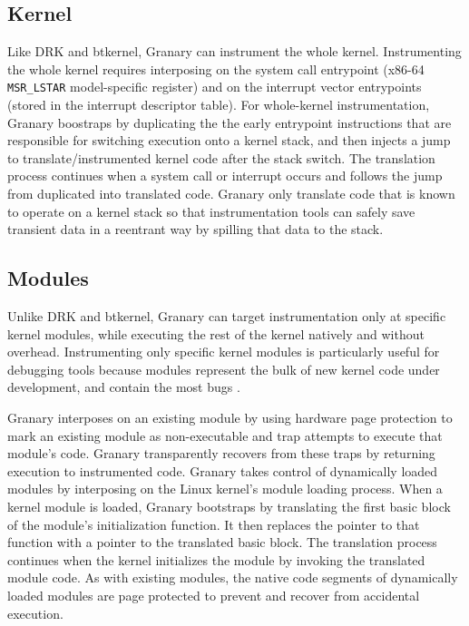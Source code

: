 \documentclass[preprint]{sigplanconf}
\begin{document}
\subsection{Kernel}
Like DRK and btkernel, Granary can instrument the whole kernel. Instrumenting the whole kernel requires interposing on the system call entrypoint (x86-64 \texttt{MSR\_LSTAR} model-specific register) and on the interrupt vector entrypoints (stored in the interrupt descriptor table). For whole-kernel instrumentation, Granary boostraps by duplicating the the early entrypoint instructions that are responsible for switching execution onto a kernel stack, and then injects a jump to translate/instrumented kernel code after the stack switch. The translation process continues when a system call or interrupt occurs and follows the jump from duplicated into translated code. Granary only translate code that is known to operate on a kernel stack so that instrumentation tools can safely save transient data in a reentrant way by spilling that data to the stack.

\subsection{Modules}\label{sec:module}

Unlike DRK and btkernel, Granary can target instrumentation only at specific kernel modules, while executing the rest of the kernel natively and without overhead. Instrumenting only specific kernel modules is particularly useful for debugging tools because modules represent the bulk of new kernel code under development, and contain the most bugs \cite{FaultsInLinux}.

Granary interposes on an existing module by using hardware page protection to mark an existing module as non-executable and trap attempts to execute that module's code. Granary transparently recovers from these traps by returning execution to instrumented code. Granary takes control of dynamically loaded modules by interposing on the Linux kernel's module loading process. When a kernel module is loaded, Granary bootstraps by translating the first basic block of the module's initialization function.  It then replaces the pointer to that function with a pointer to the translated basic block. The translation process continues when the kernel initializes the module by invoking the translated module code. As with existing modules, the native code segments of dynamically loaded modules are page protected to prevent and recover from accidental execution. 
\end{document}

